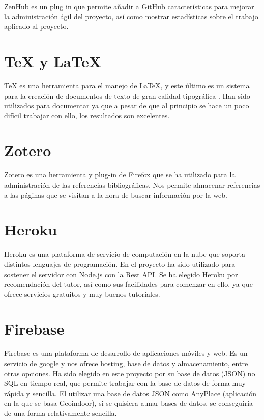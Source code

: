 ZenHub es un plug in que permite añadir a GitHub características para mejorar la administración ágil del proyecto, así como mostrar estadísticas sobre el trabajo aplicado al proyecto.



\section{\TeX{} y \LaTeX}\label{Latex}

\TeX{} es una herramienta para el manejo de \LaTeX{}, y este último es un sistema para la creación de documentos de texto de gran calidad tipográfica \cite{latexbib} \cite{texbib}.
Han sido utilizados para documentar ya que a pesar de que al principio se hace un poco difícil trabajar con ello, los resultados son excelentes.

\section{Zotero}\label{zotero}

Zotero es una herramienta y plug-in de Firefox que se ha utilizado para la administración de las referencias bibliográficas. Nos permite almacenar referencias a las páginas que se visitan a la hora de buscar información por la web. 

\section{Heroku}\label{heroku}

Heroku es una plataforma de servicio de computación en la nube que soporta distintos lenguajes de programación.
En el proyecto ha sido utilizado para sostener el servidor con Node.js con la Rest API. Se ha elegido Heroku por recomendación del tutor, así como sus facilidades para comenzar en ello, ya que ofrece servicios gratuitos y muy buenos tutoriales.

\section{Firebase}\label{firebase}

Firebase es una plataforma de desarrollo de aplicaciones móviles y web. Es un servicio de google y nos ofrece hosting, base de datos y almacenamiento, entre otras opciones. Ha sido elegido en este proyecto por su base de datos (JSON) no SQL en tiempo real, que permite trabajar con la base de datos de forma muy rápida y sencilla. El utilizar una base de datos JSON como AnyPlace (aplicación en la que se basa Geoindoor), si se quisiera aunar bases de datos, se conseguiría de una forma relativamente sencilla.


